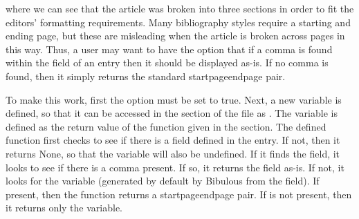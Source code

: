 \documentclass[letterpaper,10pt,english]{sphinxmanual}
\begin{document}
%
\begin{sphinxVerbatim}[commandchars=\\\{\}]
     
   
  
  
  
  
    
\end{sphinxVerbatim}

where we can see that the article was broken into three sections in order to fit the editors’ formatting requirements. Many bibliography styles require a starting and ending page, but these are misleading when the article is broken across pages in this way. Thus, a user may want to have the option that if a comma is found within the  field of an entry then it should be displayed as-is. If no comma is found, then it simply returns the standard startpage\textendash{}endpage pair.

To make this work, first the option  must be set to true. Next, a new  variable is defined, so that it can be accessed in the  section of the file as . The variable is defined as the return value of the function  given in the  section. The defined function first checks to see if there is a  field defined in the entry. If not, then it returns None, so that the  variable will also be undefined. If it finds the  field, it looks to see if there is a comma present. If so, it returns the field as-is. If not, it looks for the  variable (generated by default by Bibulous from the  field). If present, then the function returns a startpage\textendash{}endpage pair. If  is not present, then it returns only the  variable.
\end{document}
